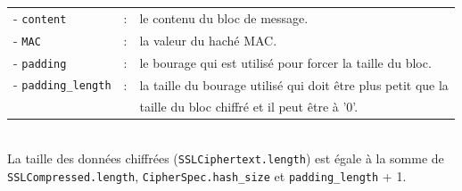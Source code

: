\begin{tabular}{llm{10cm}}
- \texttt{content}          & : & le contenu du bloc de message. \\
- \texttt{MAC}              & : & la valeur du haché MAC.\\
- \texttt{padding}          & : & le bourage qui est utilisé pour forcer la taille du bloc.\\
- \texttt{padding\_length}  & : & la taille du bourage utilisé qui doit être plus petit que la \\
                            &   & taille du bloc chiffré et il peut être à '0'.\\
\end{tabular}
\\

La taille des données chiffrées (\texttt{SSLCiphertext.length}) est égale à la somme de \texttt{SSLCompressed.length}, \texttt{CipherSpec.hash\_size} et \texttt{padding\_length} + 1.

